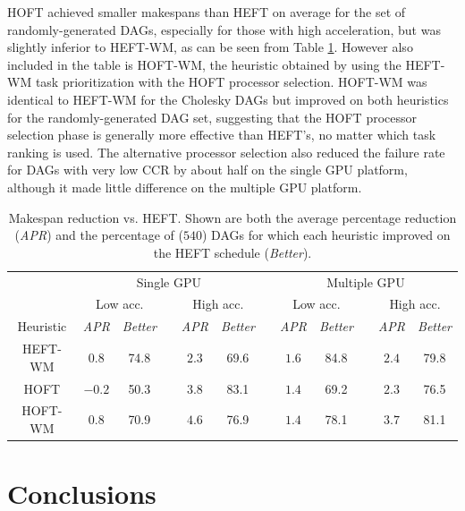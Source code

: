 \documentclass[runningheads]{llncs}
\begin{document}
HOFT achieved smaller makespans than HEFT on average for the set of randomly-generated DAGs, especially for those with high acceleration, but was slightly inferior to HEFT-WM, as can be seen from Table \ref{tb.hoft_random_DAGs}. However also included in the table is HOFT-WM, the heuristic obtained by using the HEFT-WM task prioritization with the HOFT processor selection. HOFT-WM was identical to HEFT-WM for the Cholesky DAGs but improved on both heuristics for the randomly-generated DAG set, suggesting that the HOFT processor selection phase is generally more effective than HEFT's, no matter which task ranking is used. The alternative processor selection also reduced the failure rate for DAGs with very low CCR by about half on the single GPU platform, although it made little difference on the multiple GPU platform.

\begin{table}
	\caption{Makespan reduction vs. HEFT. Shown are both the average percentage reduction ({\em APR}) and the percentage of ($540$) DAGs for which each heuristic improved on the HEFT schedule ({\em Better}).} 
	\begin{center}	
		\begin{tabular}{c c c c c c c c c c c c}
			\toprule
			& \multicolumn{5}{c}{Single GPU} && \multicolumn{5}{c}{Multiple GPU}\\
			\cmidrule{2-6} \cmidrule{8-12}
			& \multicolumn{2}{c}{Low acc.} && \multicolumn{2}{c}{High acc.} && \multicolumn{2}{c}{Low acc.} && \multicolumn{2}{c}{High acc.}\\
			\cmidrule{2-3} \cmidrule{5-6} \cmidrule{8-9} \cmidrule{11-12}
			Heuristic & {\em APR} & {\em Better} && {\em APR} & {\em Better} && {\em APR} & {\em Better} && {\em APR} & {\em Better}\\
			\cmidrule{1-12}
			HEFT-WM & $0.8$ & 74.8 && $2.3$ & 69.6 && $1.6$ & 84.8 && $2.4$ & 79.8\\
			HOFT & $-0.2$ & 50.3 && $3.8$ & 83.1 && $1.4$ & 69.2 && $2.3$ & 76.5\\
			HOFT-WM & $0.8$ & 70.9 && $4.6$ & 76.9 && $1.4$ & 78.1 && $3.7$ & 81.1\\ 
			\bottomrule			
		\end{tabular}
		\label{tb.hoft_random_DAGs}
	\end{center}	
\end{table}


\section{Conclusions}
\label{sect.conclusion}
\end{document}
